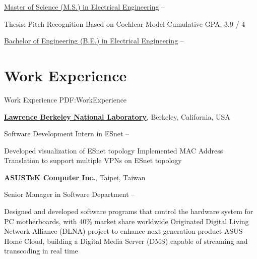 \documentclass[a4paper,10pt,oneside]{article}
\begin{document}
\begin{body}
\SmallEntryGap
\href{http://www.ee.ntu.edu.tw/graduate/}
{Master of Science (M.S.) in Electrical Engineering}
\hfill
{} --

\begin{detail}
\BulletItem
Thesis: Pitch Recognition Based on Cochlear Model
\BulletItem
Cumulative GPA: 3.9 / 4
\end{detail}

\SmallEntryGap
\href{http://www.ee.ntu.edu.tw/graduate/}
{Bachelor of Engineering (B.E.) in Electrical Engineering}
\hfill
{} --





\section{Work Experience}
{Work Experience}
{PDF:WorkExperience}

\href{https://www.es.net/}
{\textbf{Lawrence Berkeley National Laboratory}},
Berkeley, California, USA
\par
Software Development Intern in ESnet
\hfill
{} --
\begin{detail}
\BulletItem
Developed visualization of ESnet topology
\BulletItem
Implemented MAC Address Translation to support multiple VPNs on ESnet topology
\end{detail}

\EntryGap
\href{http://www.asus.com/US/}
{\textbf{ASUSTeK Computer Inc.}}, Taipei, Taiwan
\par
Senior Manager in Software Department
\hfill
{} --
\begin{detail}
\BulletItem
Designed and developed software programs that control the hardware system for PC motherboards, with 40\% market share worldwide
\BulletItem
Originated Digital Living Network Alliance (DLNA) project to enhance next generation product ASUS Home Cloud, building a Digital Media Server (DMS) capable of streaming and transcoding in real time
\end{detail}


\end{body}
\end{document}
